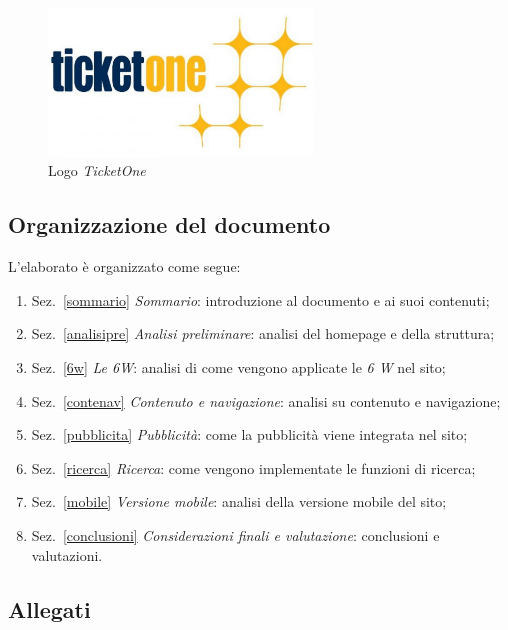 \begin{figure}[hbt]
	\centering
	\includegraphics[width=7cm]{img/ticketone_logo.jpeg}
	\caption{Logo \textit{TicketOne}}
	\label{fig:logo}
\end{figure}

\newpage
\subsection{Organizzazione del documento}
	\par L'elaborato è organizzato come segue:
	\begin{enumerate}
		\item Sez.~\ref{sommario} \textit{Sommario}: introduzione al documento e ai suoi contenuti;
		\item Sez.~\ref{analisipre} \textit{Analisi preliminare}: analisi del homepage e della struttura;  
		\item Sez.~\ref{6w} \textit{Le 6W}: analisi di come vengono applicate le \textit{6 W} nel sito;
		\item Sez.~\ref{contenav} \textit{Contenuto e navigazione}: analisi su contenuto e navigazione; 
		\item Sez.~\ref{pubblicita} \textit{Pubblicità}: come la pubblicità viene integrata nel sito; 	
		\item Sez.~\ref{ricerca} \textit{Ricerca}: come vengono implementate le funzioni di ricerca;
		\item Sez.~\ref{mobile} \textit{Versione mobile}: analisi della versione mobile del sito;
		\item Sez.~\ref{conclusioni} \textit{Considerazioni finali e valutazione}: conclusioni e valutazioni. 
	\end{enumerate}

\subsection{Allegati}\label{allegati}

